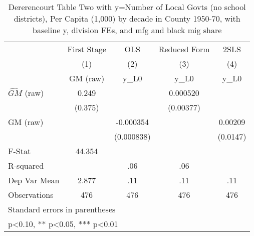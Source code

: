 \begin{table}[htbp]\centering
\def\sym#1{\ifmmode^{#1}\else\(^{#1}\)\fi}
\caption{Dererencourt Table Two with y=Number of Local Govts (no school districts), Per Capita (1,000) by decade in County 1950-70, with baseline y, division FEs, and mfg and black mig share}
\begin{tabular}{l*{4}{c}}
\toprule
                    & First Stage   &         OLS   &Reduced Form   &        2SLS   \\
                    &\multicolumn{1}{c}{(1)}&\multicolumn{1}{c}{(2)}&\multicolumn{1}{c}{(3)}&\multicolumn{1}{c}{(4)}\\
                    &\multicolumn{1}{c}{GM  (raw)}&\multicolumn{1}{c}{y\_L0}&\multicolumn{1}{c}{y\_L0}&\multicolumn{1}{c}{y\_L0}\\
\midrule
$\hat{GM}$ (raw)    &       0.249   &               &    0.000520   &               \\
                    &     (0.375)   &               &   (0.00377)   &               \\
\addlinespace
GM  (raw)           &               &   -0.000354   &               &     0.00209   \\
                    &               &  (0.000838)   &               &    (0.0147)   \\
\midrule
F-Stat              &      44.354   &               &               &               \\
R-squared           &               &         .06   &         .06   &               \\
Dep Var Mean        &       2.877   &         .11   &         .11   &         .11   \\
Observations        &         476   &         476   &         476   &         476   \\
\bottomrule
\multicolumn{5}{l}{\footnotesize Standard errors in parentheses}\\
\multicolumn{5}{l}{\footnotesize * p<0.10, ** p<0.05, *** p<0.01}\\
\end{tabular}
\end{table}

